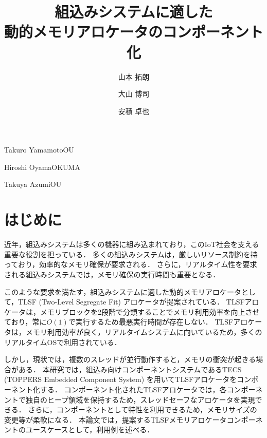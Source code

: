 \documentclass[submit]{ipsj_v2/UTF8/ipsj}
\begin{document}
\title{組込みシステムに適した\\動的メモリアロケータのコンポーネント化}




\author{山本 拓朗}{Takuro Yamamoto}{OU}%
\author{大山 博司}{Hiroshi Oyama}{OKUMA}%
\author{安積 卓也}{Takuya Azumi}{OU}%

\maketitle

\section{はじめに}
近年，組込みシステムは多くの機器に組み込まれており，このIoT社会を支える重要な役割を担っている．
多くの組込みシステムは，厳しいリソース制約を持っており，効率的なメモリ確保が要求される．
さらに，リアルタイム性を要求される組込みシステムでは，メモリ確保の実行時間も重要となる．

このような要求を満たす，組込みシステムに適した動的メモリアロケータとして，TLSF (Two-Level Segregate Fit) アロケータが提案されている．
TLSFアロケータは，メモリブロックを2段階で分類することでメモリ利用効率を向上させており，常に$O(1)$で実行するため最悪実行時間が存在しない．
TLSFアロケータは，メモリ利用効率が良く，リアルタイムシステムに向いているため，多くのリアルタイムOSで利用されている．

しかし，現状では，複数のスレッドが並行動作すると，メモリの衝突が起きる場合がある．
本研究では，組込み向けコンポーネントシステムであるTECS (TOPPERS Embedded Component System) を用いてTLSFアロケータをコンポーネント化する．
コンポーネント化されたTLSFアロケータでは，各コンポーネントで独自のヒープ領域を保持するため，スレッドセーフなアロケータを実現できる．
さらに，コンポーネントとして特性を利用できるため，メモリサイズの変更等が柔軟になる．
本論文では，提案するTLSFメモリアロケータコンポーネントのユースケースとして，利用例を述べる．

%
\end{document}

